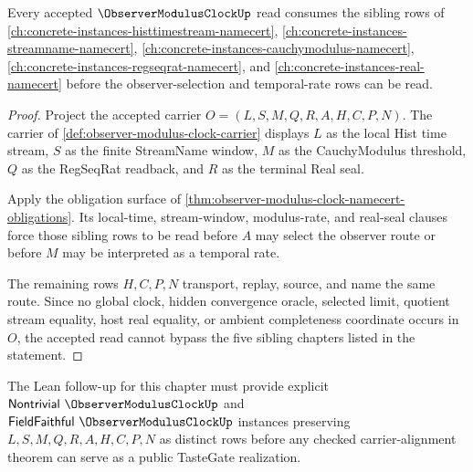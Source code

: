 \begin{theorem}
\label{thm:observer-modulus-clock-sibling-route}
Every accepted $\ObserverModulusClockUp$ read consumes the sibling rows of \autoref{ch:concrete-instances-histtimestream-namecert}, \autoref{ch:concrete-instances-streamname-namecert}, \autoref{ch:concrete-instances-cauchymodulus-namecert}, \autoref{ch:concrete-instances-regseqrat-namecert}, and \autoref{ch:concrete-instances-real-namecert} before the observer-selection and temporal-rate rows can be read.
\end{theorem}
\begin{proof}
Project the accepted carrier $O=(L,S,M,Q,R,A,H,C,P,N)$. The carrier of \autoref{def:observer-modulus-clock-carrier} displays $L$ as the local Hist time stream, $S$ as the finite StreamName window, $M$ as the CauchyModulus threshold, $Q$ as the RegSeqRat readback, and $R$ as the terminal Real seal.

Apply the obligation surface of \autoref{thm:observer-modulus-clock-namecert-obligations}. Its local-time, stream-window, modulus-rate, and real-seal clauses force those sibling rows to be read before $A$ may select the observer route or before $M$ may be interpreted as a temporal rate.

The remaining rows $H,C,P,N$ transport, replay, source, and name the same route. Since no global clock, hidden convergence oracle, selected limit, quotient stream equality, host real equality, or ambient completeness coordinate occurs in $O$, the accepted read cannot bypass the five sibling chapters listed in the statement.
\end{proof}



The Lean follow-up for this chapter must provide explicit $\mathsf{Nontrivial}\ \ObserverModulusClockUp$ and $\mathsf{FieldFaithful}\ \ObserverModulusClockUp$ instances preserving $L,S,M,Q,R,A,H,C,P,N$ as distinct rows before any checked carrier-alignment theorem can serve as a public TasteGate realization.

